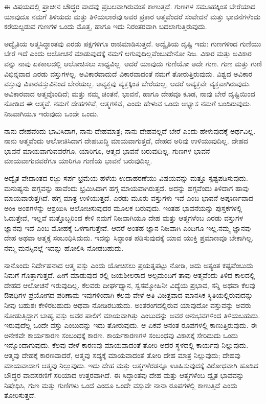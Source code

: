 ಈ ವಿಷಯದಲ್ಲಿ ಪ್ರಾಚೀನ ಬೌದ್ಧರ ವಾದವು ಪ್ರಬಲವಾಗಿರುವಂತೆ ಕಾಣುತ್ತದೆ. ಗುಣಗಳ ಸಮೂಹಕ್ಕಿಂತ ಬೇರೆಯಾದ ಯಾವುದೂ ನಮಗೆ ತಿಳಿಯದು ಮತ್ತು ತಿಳಿಯಲಾರೆವು.ಅವರ ಪ್ರಕಾರ ಆತ್ಮವೆಂದರೆ ಸಂವೇದನೆ ಮತ್ತು ಭಾವನೆಗಳೆಂದು ಕರೆಯಲ್ಪಡುವ ಗುಣಗಳ ಒಂದು ಮೊತ್ತ, ಹಾಗೂ ಇದು ನಿರಂತರವಾಗಿ ಬದಲಾಗುತ್ತಿರುವುದು.

ಅದ್ವೈತಿಯ ಆತ್ಮಸಿದ್ಧಾಂತವು ಎರಡು ಪಕ್ಷಗಳಿಗೂ ರಾಜಿಮಾಡಿಸುತ್ತದೆ. ಅದ್ವೈತಿಯ ದೃಷ್ಟಿ ಇದು: ಗುಣಗಳಿಂದ ಗುಣಿಯು ಬೇರೆ ಇದೆ ಎಂದು ಆಲೋಚನೆ ಮಾಡುವುದಕ್ಕೆ ನಮಗೆ ಆಗುವುದಿಲ್ಲವೆಂಬುದೇನೋ ನಿಜ. ವಿಕಾರ ಮತ್ತು ಅವಿಕಾರ ವನ್ನು ನಾವು ಏಕಕಾಲದಲ್ಲಿ ಆಲೋಚಿಸಲು ಸಾಧ್ಯವಿಲ್ಲ. ಆದರೆ ಯಾವುದು ಗುಣಿಯೋ ಅದೇ ಗುಣ. ಗುಣ ಮತ್ತು ಗುಣಿ ವಿಭಿನ್ನವಾದ ಎರಡು ವಸ್ತುಗಳಲ್ಲ. ಅವಿಕಾರವಾದುದೆ ವಿಕಾರವಾದಂತೆ ನಮಗೆ ತೋರುತ್ತಿರುವುದು. ವಿಶ್ವದ ಅವಿಕಾರ ವಸ್ತುವು ವಿಕಾರವಸ್ತುವಿನಿಂದ ಬೇರೆಯಲ್ಲ. ಅವ್ಯಕ್ತವು ವ್ಯಕ್ತಕ್ಕಿಂತ ಬೇರೆಯಲ್ಲ, ಆದರೆ ಅವ್ಯಕ್ತವೇ ವ್ಯಕ್ತವಾಗಿರುವುದು. ಅವಿಕಾರವಾದ ಆತ್ಮವೊಂದಿದೆ; ಮತ್ತು ನಮ್ಮ ಚಿಂತನೆ, ಭಾವನೆ, ಹಾಗೂ ದೇಹವೂ ಕೂಡ, ನಾವು ಬೇರೆ ದೃಷ್ಟಿಯಿಂದ ನೋಡಿದ ಈ ಆತ್ಮವೆ. ನಮಗೆ ದೇಹಗಳಿವೆ, ಆತ್ಮಗಳಿವೆ, ಎಂದು ಹೇಳುವ ಒಂದು ಅಭ್ಯಾಸ ನಮಗೆ ಬಂದಿರುವುದು. ನಿಜವಾಗಿಯೂ ಇರುವುದು ಒಂದೇ ಒಂದು.

ನಾನು ದೇಹವೆಂದು ಭಾವಿಸಿದಾಗ, ನಾನು ದೇಹಮಾತ್ರ; ನಾನು ದೇಹವಲ್ಲದೆ ಬೇರೆ ಎಂದು ಹೇಳುವುದಕ್ಕೆ ಅರ್ಥವಿಲ್ಲ. ನಾನು ಆತ್ಮವೆಂದು ಆಲೋಚಿಸಿದಾಗ ದೇಹಬುದ್ಧಿ ಮಾಯವಾಗುತ್ತದೆ, ದೇಹದ ಅರಿವು ಉಳಿಯುವುದಿಲ್ಲ. ದೇಹದ ಭಾವನೆ ಮಾಯವಾಗುವವರೆಗೂ, ಯಾರಿಗೂ, ಆತ್ಮದ ಭಾವನೆ ಬರುವುದಿಲ್ಲ. ಗುಣಗಳ ಭಾವನೆ ಮಾಯವಾಗುವವರೆಗೂ ಯಾರಿಗೂ ಗುಣಿಯ ಭಾವನೆ ಬರುವುದಿಲ್ಲ.

ಅದ್ವೈತ ವೇದಾಂತದ ರಜ್ಜು ಸರ್ಪ ಭ್ರಮೆಯ ಹಳೆಯ ಉದಾಹರಣೆಯು ವಿಷಯವನ್ನು ಮತ್ತೂ ಸ್ಪಷ್ಟಪಡಿಸುವುದು. ಮನುಷ್ಯನು ಹಗ್ಗವನ್ನು ಹಾವೆಂದು ಭ್ರಮಿಸಿದಾಗ ಹಗ್ಗ ಮಾಯವಾಗಿರುತ್ತದೆ. ಅದನ್ನು ಹಗ್ಗವೆಂದು ತಿಳಿದಾಗ ಹಾವು ಮಾಯವಾರುತ್ತಗಿದೆ. ಹಗ್ಗ ಮಾತ್ರ ಉಳಿಯುತ್ತದೆ. ಎರಡು ಮೂರು ವಸ್ತುಗಳು ಇವೆ ಎಂಬ ಭಾವನೆ ಅಪೂರ್ಣವಾದ ಅಂಕಿ ಅಂಶಗಳನ್ನು ಆಶ್ರಯಿಸಿ ಆಲೋಚಿಸುವುದರ ಮೂಲಕ ಬರುವುದು. ಇಂತಹ ಭಾವನೆಯನ್ನು ಪುಸ್ತಕಗಳಲ್ಲಿ ಓದುತ್ತೇವೆ, ಇಲ್ಲವೆ ಮತ್ತೊಬ್ಬರಿಂದ ಕೇಳಿ ನಮಗೆ ನಿಜವಾಗಿಯೂ ದೇಹ ಮತ್ತು ಆತ್ಮಗಳೆಂಬ ಎರಡು ವಸ್ತುಗಳ ಜ್ಞಾನವು ಇದೆ ಎಂಬ ಮೋಹಕ್ಕೆ ಒಳಗಾಗುತ್ತೇವೆ. ಆದರೆ ಅಂತಹ ಜ್ಞಾನ ನಿಜವಾಗಿ ಎಂದಿಗೂ ಇಲ್ಲ.ನಮ್ಮ ಜ್ಞಾನವು ದೇಹ ಅಥವಾ ಆತ್ಮಕ್ಕೆ ಸಂಬಂಧಿಸಿದುದು. ಇದನ್ನು ಸಿದ್ಧಾಂತ ಪಡಿಸುವುದಕ್ಕೆ ಯಾವ ಯುಕ್ತಿ ಪ್ರಮಾಣವೂ ಬೇಕಾಗಿಲ್ಲ. ನಮ್ಮ ಮನಸ್ಸಿನಲ್ಲೆ ಇದನ್ನು ಹೋಲಿಸಿ ನೋಡಬಹುದು.

ನಾನೊಂದು ನಿರ್ದೇಹನಾದ ಆತ್ಮ ವಸ್ತು ಎಂದು ಯೋಚಿಸಲು ಪ್ರಯತ್ನಪಟ್ಟು ನೋಡಿ, ಅದು ಅತ್ಯಂತ ಕಷ್ಟವೆಂಬುದು ನಿಮಗೆ ಗೊತ್ತಾಗುತ್ತದೆ. ಹೀಗೆ ಮಾಡುವುದ ರಲ್ಲಿ ಜಯಶೀಲರಾದ ಅಲ್ಪಮಂದಿಗೆ ತಾವು ಆತ್ಮವೆಂದು ತಿಳಿದ ಕಾಲದಲ್ಲಿ ದೇಹದ ಆಲೋಚನೆ ಇರುವುದಿಲ್ಲ. ಕೆಲವರು ದೀರ್ಘಧ್ಯಾನ, ಸ್ವಸಮ್ಮೋಹಿನೀ ವಿದ್ಯೆಯ ಪ್ರಭಾವ, ಸನ್ನಿ ಅಥವಾ ಕೆಲವು ಔಷಧಿಗಳ ಪ್ರಯೋಗದ ಪರಿಣಾಮ ಇವುಗಳಿಂದಾಗಿ ಕೆಲವು ವೇಳೆ ಅತಿ ವಿಚಿತ್ರವಾದ ಮಾನಸಿಕ ಸ್ಥಿತಿಯಲ್ಲಿರುವುದನ್ನು ನೀವು ಬಹುಶಃ ಕೇಳಿರಬಹುದು ಅಥವಾ ನೋಡಿರಬಹುದು. ಅಂತರಂಗದಲ್ಲಿರುವ ಯಾವುದೋ ವಸ್ತುವನ್ನು ಅವರು ನೋಡುತ್ತಿದ್ದಾಗ ಬಾಹ್ಯ ವಸ್ತು ಅವರ ಪಾಲಿಗೆ ಮಾಯವಾಗಿತ್ತು ಎಂಬುದನ್ನು ಅವರ ಅನುಭವಗಳಿಂದ ತಿಳಿಯಬಹುದು. ಇರುವುದೆಲ್ಲ ಒಂದೇ ವಸ್ತು ಎಂಬುದನ್ನು ಇದು ತೋರುವುದು. ಆ ಏಕವೆ ಅನಂತ ರೂಪಗಳಲ್ಲಿ ಕಾಣುತ್ತಿರುವುದು. ಈ ಅನೇಕವೇ ಕಾರ್ಯಕಾರಣ ಸಂಬಂಧಕ್ಕೆ ಕಾರಣ. ಕಾರ್ಯಕಾರಣಗಳ ಸಂಬಂಧವು ವಿಕಾಸಕ್ಕೆ ಸೇರಿದುದು ಒಂದು ಇನ್ನೊಂದಾಗುವುದು. ಕೆಲವು ವೇಳೆ ಕಾರಣವು ಮಾಯವಾದಂತೆ ತೋರಿ ಅದರ ಸ್ಥಳದಲ್ಲಿ ಕಾರ್ಯವು ನಿಲ್ಲುವುದು. ಆತ್ಮವು ದೇಹಕ್ಕೆ ಕಾರಣವಾದರೆ, ಆತ್ಮವು ಸದ್ಯಕ್ಕೆ ಮಾಯವಾದಂತೆ ತೋರಿ ದೇಹ ಮಾತ್ರ ನಿಲ್ಲುವುದು; ದೇಹವು ಮಾಯವಾದಾಗ ಆತ್ಮವು ನಿಲ್ಲುವುದು. ಇದು ದೇಹ ಮತ್ತು ಆತ್ಮಗಳೆರಡನ್ನೂ ಊಹಿಸುವುದಕ್ಕೆ ವಿರೋಧವಾಗಿ ಹೂಡಿದ ಬೌದ್ಧರ ವಾದಸರಣಿಗೆ ಸರಿಯಾದ ಉತ್ತರವಾಗಿದೆ. ಈ ಸಿದ್ಧಾಂತವು ದೇಹ ಮತ್ತು ಆತ್ಮಗಳೆಂಬ ದ್ವೈತ ಭಾವವನ್ನು ನಿಷೇಧಿಸಿ, ಗುಣ ಮತ್ತು ಗುಣಿಗಳು ಒಂದೆ ಎಂದೂ ಒಂದೇ ವಸ್ತುವೇ ನಾನಾ ರೂಪಗಳಲ್ಲಿ ಕಾಣುತ್ತಿದೆ ಎಂದು ತೋರಿಸುತ್ತದೆ.

